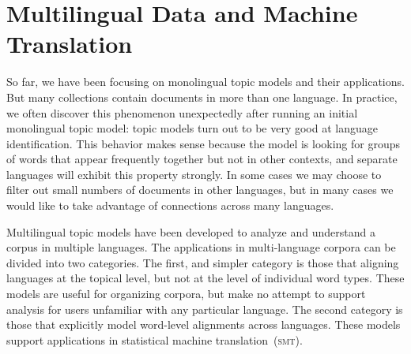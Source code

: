 \chapter{Multilingual Data and Machine Translation}
\label{ch:mt}

So far, we have been focusing on monolingual topic models and their applications.
But many collections contain documents in more than one language.
In practice, we often discover this phenomenon unexpectedly after running an initial monolingual topic model: topic models turn out to be very good at language identification.
This behavior makes sense because the model is looking for groups of words that appear frequently together but not in other contexts, and separate languages will exhibit this property strongly.
In some cases we may choose to filter out small numbers of documents in other languages, but in many cases we would like to take advantage of  connections across many languages.

Multilingual topic models have been developed to analyze and understand a corpus in multiple languages.
The applications in multi-language corpora can be divided into two categories.
The first, and simpler category is those that aligning languages at the topical level, but not at the level of individual word types.
These models are useful for organizing corpora, but make no attempt to support analysis for users unfamiliar with any particular language.
The second category is those that explicitly model word-level alignments across languages.
These models support applications in statistical machine translation~(\textsc{smt}).

